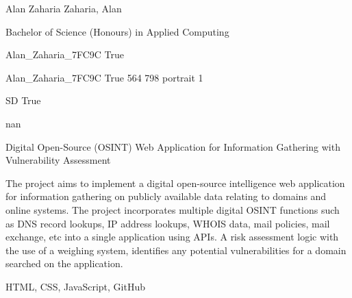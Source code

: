 
\begingroup{}\relax



\def\Key{Alan_Zaharia_7FC9C}

{Alan Zaharia}
{Zaharia, Alan}

{Bachelor of Science (Honours) in Applied Computing}

{Alan_Zaharia_7FC9C}
{True}

{Alan_Zaharia_7FC9C}
{True}
{564}
{798}
{portrait}
{1}

{SD}
{True}

{nan}

{Digital Open-Source (OSINT) Web Application for Information Gathering with Vulnerability Assessment}

{The project aims to implement a digital open-source intelligence web application for information gathering on publicly available data relating to domains and online systems. The project incorporates multiple digital OSINT functions such as DNS record lookups, IP address lookups, WHOIS data, mail policies, mail exchange, etc into a single application using APIs.
A risk assessment logic with the use of a weighing system, identifies any potential vulnerabilities for a domain searched on the application.}

{HTML, CSS, JavaScript, GitHub}

